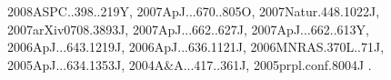 \documentclass[12pt]{article}
\begin{document}
\begin{enumerate}
\begin{enumerate}
{2008ASPC..398..219Y,%
2007ApJ...670..805O,%
2007Natur.448.1022J,%
2007arXiv0708.3893J,%
2007ApJ...662..627J,%
2007ApJ...662..613Y,%
2006ApJ...643.1219J,%
2006ApJ...636.1121J,%
2006MNRAS.370L..71J,%
2005ApJ...634.1353J,%
2004A&A...417..361J,%
2005prpl.conf.8004J%
}.


\end{enumerate}
\end{enumerate}
\end{document}

